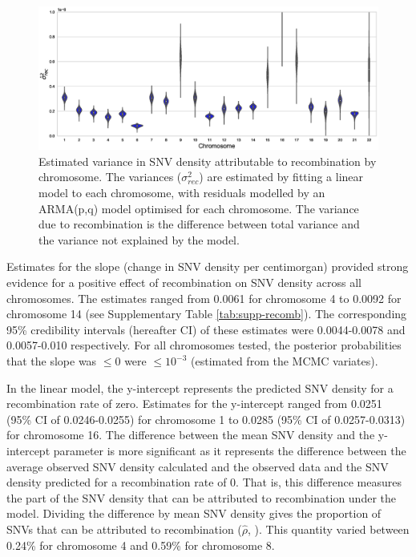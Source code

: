 \begin{figure}[h!]
\begin{center}
\includegraphics[width=1.0\textwidth]{figs/violin_plot_sexav_mono.eps}
\caption{Estimated variance in SNV density attributable to recombination by chromosome. The variances ($\sigma^2_{rec}$) are estimated by fitting a linear model to each chromosome, with residuals modelled by an ARMA(p,q) model optimised for each chromosome. The variance due to recombination is the difference between total variance and the variance not explained by the model.}
\label{fig:recomb-violin}
\end{center}
\end{figure}

Estimates for the slope (change in SNV density per centimorgan) provided strong evidence for a positive effect of recombination on SNV density across all chromosomes. The estimates ranged from 0.0061 for chromosome 4 to 0.0092 for chromosome 14 (see Supplementary Table \ref{tab:supp-recomb}). The corresponding 95\% credibility intervals (hereafter CI) of these estimates were 0.0044-0.0078 and 0.0057-0.010 respectively. For all chromosomes tested, the posterior probabilities that the slope was $\leq 0$ were $\leq 10^{-3}$ (estimated from the MCMC variates).

In the linear model, the y-intercept represents the predicted SNV density for a recombination rate of zero. Estimates for the y-intercept ranged from 0.0251 (95\% CI of 0.0246-0.0255) for chromosome 1 to 0.0285 (95\% CI of 0.0257-0.0313) for chromosome 16. The difference between the mean SNV density and the y-intercept parameter is more significant as it represents the difference between the average observed SNV density calculated and the observed data and the SNV density predicted for a recombination rate of 0. That is, this difference measures the part of the SNV density that can be attributed  to recombination under the model. Dividing the difference by mean SNV density gives the proportion of SNVs that can be attributed to recombination ($\hat\rho$, ). This quantity varied between 0.24\% for chromosome 4 and 0.59\% for chromosome 8. 


